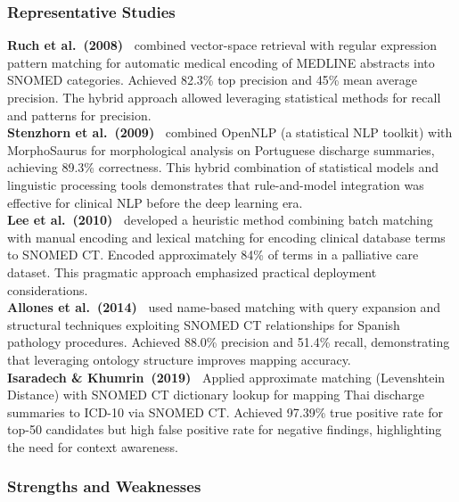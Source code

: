 \subsubsection{Representative Studies}

\textbf{Ruch et al.~(2008)~\cite{Ruch:2008}} combined vector-space retrieval with regular expression pattern matching for automatic medical encoding of MEDLINE abstracts into SNOMED categories. Achieved 82.3\% top precision and 45\% mean average precision. The hybrid approach allowed leveraging statistical methods for recall and patterns for precision.\\

\textbf{Stenzhorn et al.~(2009)~\cite{Stenzhorn:2009}} combined OpenNLP (a statistical NLP toolkit) with MorphoSaurus for morphological analysis on Portuguese discharge summaries, achieving 89.3\% correctness. This hybrid combination of statistical models and linguistic processing tools demonstrates that rule-and-model integration was effective for clinical NLP before the deep learning era.\\

\textbf{Lee et al.~(2010)~\cite{Lee:2010}} developed a heuristic method combining batch matching with manual encoding and lexical matching for encoding clinical database terms to SNOMED CT. Encoded approximately 84\% of terms in a palliative care dataset. This pragmatic approach emphasized practical deployment considerations.\\

\textbf{Allones et al.~(2014)~\cite{Allones:2014}} used name-based matching with query expansion and structural techniques exploiting SNOMED CT relationships for Spanish pathology procedures. Achieved 88.0\% precision and 51.4\% recall, demonstrating that leveraging ontology structure improves mapping accuracy.\\

\textbf{Isaradech \& Khumrin~(2019)~\cite{Isaradech:2019}} Applied approximate matching (Levenshtein Distance) with SNOMED CT dictionary lookup for mapping Thai discharge summaries to ICD-10 via SNOMED CT. Achieved 97.39\% true positive rate for top-50 candidates but high false positive rate for negative findings, highlighting the need for context awareness.

\subsubsection{Strengths and Weaknesses}

